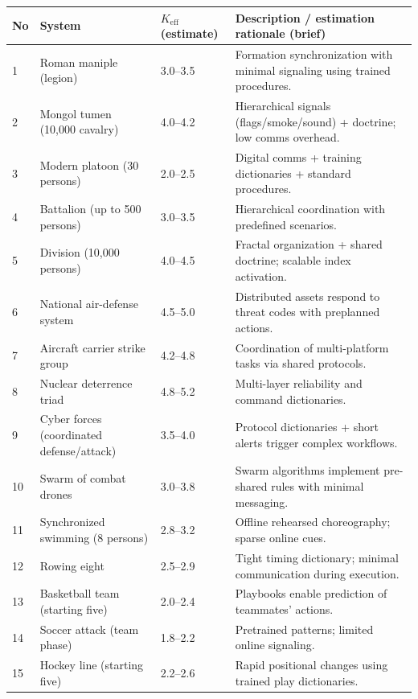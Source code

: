 \documentclass[13pt,a4paper]{article}
\begin{document}
	\begin{longtable}{|p{0.8cm}|p{6.2cm}|p{3.0cm}|p{5.7cm}|}
		\hline
		\textbf{No} & \textbf{System} & \textbf{$K_{\mathrm{eff}}$ (estimate)} & \textbf{Description / estimation rationale (brief)} \\
		\hline
		\endhead
		1 & Roman maniple (legion) & 3.0--3.5 & Formation synchronization with minimal signaling using trained procedures. \\
		\hline
		2 & Mongol tumen (10{,}000 cavalry) & 4.0--4.2 & Hierarchical signals (flags/smoke/sound) + doctrine; low comms overhead. \\
		\hline
		3 & Modern platoon (30 persons) & 2.0--2.5 & Digital comms + training dictionaries + standard procedures. \\
		\hline
		4 & Battalion (up to 500 persons) & 3.0--3.5 & Hierarchical coordination with predefined scenarios. \\
		\hline
		5 & Division (10{,}000 persons) & 4.0--4.5 & Fractal organization + shared doctrine; scalable index activation. \\
		\hline
		6 & National air-defense system & 4.5--5.0 & Distributed assets respond to threat codes with preplanned actions. \\
		\hline
		7 & Aircraft carrier strike group & 4.2--4.8 & Coordination of multi-platform tasks via shared protocols. \\
		\hline
		8 & Nuclear deterrence triad & 4.8--5.2 & Multi-layer reliability and command dictionaries. \\
		\hline
		9 & Cyber forces (coordinated defense/attack) & 3.5--4.0 & Protocol dictionaries + short alerts trigger complex workflows. \\
		\hline
		10 & Swarm of combat drones & 3.0--3.8 & Swarm algorithms implement pre-shared rules with minimal messaging. \\
		\hline
		11 & Synchronized swimming (8 persons) & 2.8--3.2 & Offline rehearsed choreography; sparse online cues. \\
		\hline
		12 & Rowing eight & 2.5--2.9 & Tight timing dictionary; minimal communication during execution. \\
		\hline
		13 & Basketball team (starting five) & 2.0--2.4 & Playbooks enable prediction of teammates’ actions. \\
		\hline
		14 & Soccer attack (team phase) & 1.8--2.2 & Pretrained patterns; limited online signaling. \\
		\hline
		15 & Hockey line (starting five) & 2.2--2.6 & Rapid positional changes using trained play dictionaries. \\

\end{longtable}
\end{document}
